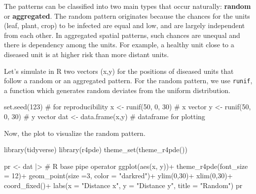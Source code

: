 \documentclass[
  letterpaper,
]{book}
\newenvironment{Shaded}{\begin{snugshade}}{\end{snugshade}}
\newcommand{\AttributeTok}[1]{\textcolor[rgb]{0.40,0.45,0.13}{#1}}
\newcommand{\CommentTok}[1]{\textcolor[rgb]{0.37,0.37,0.37}{#1}}
\newcommand{\DecValTok}[1]{\textcolor[rgb]{0.68,0.00,0.00}{#1}}
\newcommand{\FunctionTok}[1]{\textcolor[rgb]{0.28,0.35,0.67}{#1}}
\newcommand{\NormalTok}[1]{\textcolor[rgb]{0.00,0.23,0.31}{#1}}
\newcommand{\OtherTok}[1]{\textcolor[rgb]{0.00,0.23,0.31}{#1}}
\newcommand{\SpecialCharTok}[1]{\textcolor[rgb]{0.37,0.37,0.37}{#1}}
\newcommand{\StringTok}[1]{\textcolor[rgb]{0.13,0.47,0.30}{#1}}
\begin{document}
The patterns can be classified into two main types that occur naturally:
\textbf{random} or \textbf{aggregated}. The random pattern originates
because the chances for the units (leaf, plant, crop) to be infected are
equal and low, and are largely independent from each other. In
aggregated spatial patterns, such chances are unequal and there is
dependency among the units. For example, a healthy unit close to a
diseased unit is at higher risk than more distant units.

Let's simulate in R two vectors (x,y) for the positions of diseased
units that follow a random or an aggregated pattern. For the random
pattern, we use \texttt{runif}, a function which generates random
deviates from the uniform distribution.

\begin{Shaded}
\begin{Highlighting}[]
\FunctionTok{set.seed}\NormalTok{(}\DecValTok{123}\NormalTok{)          }\CommentTok{\# for reproducibility}
\NormalTok{x }\OtherTok{\textless{}{-}} \FunctionTok{runif}\NormalTok{(}\DecValTok{50}\NormalTok{, }\DecValTok{0}\NormalTok{, }\DecValTok{30}\NormalTok{)  }\CommentTok{\# x vector}
\NormalTok{y }\OtherTok{\textless{}{-}} \FunctionTok{runif}\NormalTok{(}\DecValTok{50}\NormalTok{, }\DecValTok{0}\NormalTok{, }\DecValTok{30}\NormalTok{)  }\CommentTok{\# y vector}
\NormalTok{dat }\OtherTok{\textless{}{-}} \FunctionTok{data.frame}\NormalTok{(x,y) }\CommentTok{\# dataframe for plotting}
\end{Highlighting}
\end{Shaded}

Now, the plot to visualize the random pattern.

\begin{Shaded}
\begin{Highlighting}[]
\FunctionTok{library}\NormalTok{(tidyverse) }
\FunctionTok{library}\NormalTok{(r4pde)}
\FunctionTok{theme\_set}\NormalTok{(}\FunctionTok{theme\_r4pde}\NormalTok{())}

\NormalTok{pr }\OtherTok{\textless{}{-}}\NormalTok{ dat }\SpecialCharTok{|\textgreater{}} \CommentTok{\# R base pipe operator}
  \FunctionTok{ggplot}\NormalTok{(}\FunctionTok{aes}\NormalTok{(x, y))}\SpecialCharTok{+}
  \FunctionTok{theme\_r4pde}\NormalTok{(}\AttributeTok{font\_size =} \DecValTok{12}\NormalTok{)}\SpecialCharTok{+}
  \FunctionTok{geom\_point}\NormalTok{(}\AttributeTok{size =}\DecValTok{3}\NormalTok{, }
             \AttributeTok{color =} \StringTok{"darkred"}\NormalTok{)}\SpecialCharTok{+}
  \FunctionTok{ylim}\NormalTok{(}\DecValTok{0}\NormalTok{,}\DecValTok{30}\NormalTok{)}\SpecialCharTok{+}
  \FunctionTok{xlim}\NormalTok{(}\DecValTok{0}\NormalTok{,}\DecValTok{30}\NormalTok{)}\SpecialCharTok{+}
  \FunctionTok{coord\_fixed}\NormalTok{()}\SpecialCharTok{+}
  \FunctionTok{labs}\NormalTok{(}\AttributeTok{x =} \StringTok{"Distance x"}\NormalTok{, }\AttributeTok{y =} \StringTok{"Distance y"}\NormalTok{, }
       \AttributeTok{title =} \StringTok{"Random"}\NormalTok{)}
\NormalTok{pr}
\end{Highlighting}
\end{Shaded}
\end{document}
